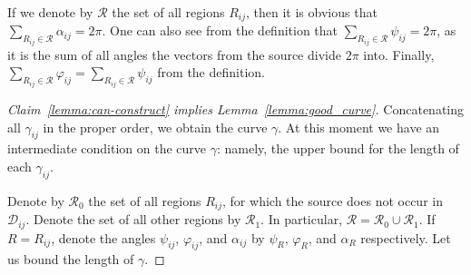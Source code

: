 
If we denote by $\mathcal{R}$ the set of all regions $R_{ij}$, then it is obvious that $\sum_{R_{ij}\in\mathcal{R}}\alpha_{ij} = 2\pi$. One can also see from the definition that $\sum_{R_{ij}\in\mathcal{R}}\psi_{ij} = 2\pi$, as it is the sum of all angles the vectors from the source divide $2\pi$ into. Finally, $\sum_{R_{ij}\in\mathcal{R}}\varphi_{ij} = \sum_{R_{ij}\in\mathcal{R}}\psi_{ij}$ from the definition.

\begin{proof}[Claim~\ref{lemma:can-construct} implies Lemma~\ref{lemma:good_curve}]
Concatenating all $\gamma_{ij}$ in the proper order, we obtain the curve $\gamma$. At this moment we have an intermediate condition on the curve $\gamma$: namely, the upper bound for the length of each $\gamma_{ij}$. %


%
Denote by $\mathcal{R}_0$ the set of all regions $R_{ij}$, for which the source does not occur in $\mathcal{D}_{ij}$. Denote the set of all other regions by $\mathcal{R}_1$. In particular, $\mathcal{R} = \mathcal{R}_0\cup\mathcal{R}_1$. If $R = R_{ij}$, denote the angles $\psi_{ij}$, $\varphi_{ij}$, and $\alpha_{ij}$ by $\psi_R$, $\varphi_R$, and $\alpha_R$ respectively. Let us bound the length of $\gamma$.



\end{proof}
